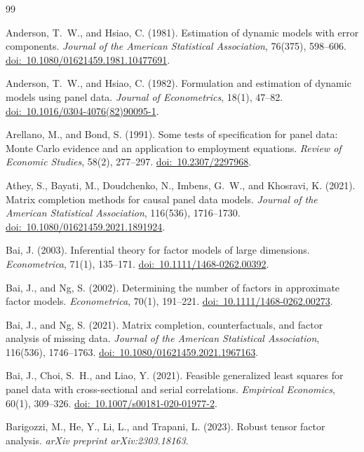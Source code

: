 \documentclass[11pt]{article}
\numberwithin{equation}{section}
\theoremstyle{remark}
\newcommand{\doilink}[1]{\href{https://doi.org/#1}{doi:\ #1}}
\begin{document}
\begin{singlespace}
\begin{thebibliography}{99}

Anderson, T.~W., and Hsiao, C. (1981).
Estimation of dynamic models with error components.
\emph{Journal of the American Statistical Association}, 76(375), 598--606.
\doilink{10.1080/01621459.1981.10477691}.

Anderson, T.~W., and Hsiao, C. (1982).
Formulation and estimation of dynamic models using panel data.
\emph{Journal of Econometrics}, 18(1), 47--82.
\doilink{10.1016/0304-4076(82)90095-1}.

Arellano, M., and Bond, S. (1991).
Some tests of specification for panel data: Monte Carlo evidence and an application to employment equations.
\emph{Review of Economic Studies}, 58(2), 277--297.
\doilink{10.2307/2297968}.

Athey, S., Bayati, M., Doudchenko, N., Imbens, G.~W., and Khosravi, K. (2021).
Matrix completion methods for causal panel data models.
\emph{Journal of the American Statistical Association}, 116(536), 1716--1730.
\doilink{10.1080/01621459.2021.1891924}.

Bai, J. (2003).
Inferential theory for factor models of large dimensions.
\emph{Econometrica}, 71(1), 135--171.
\doilink{10.1111/1468-0262.00392}.

Bai, J., and Ng, S. (2002).
Determining the number of factors in approximate factor models.
\emph{Econometrica}, 70(1), 191--221.
\doilink{10.1111/1468-0262.00273}.

Bai, J., and Ng, S. (2021).
Matrix completion, counterfactuals, and factor analysis of missing data.
\emph{Journal of the American Statistical Association}, 116(536), 1746--1763.
\doilink{10.1080/01621459.2021.1967163}.


Bai, J., Choi, S.~H., and Liao, Y. (2021).
Feasible generalized least squares for panel data with cross-sectional and serial correlations.
\emph{Empirical Economics}, 60(1), 309--326.
\doilink{10.1007/s00181-020-01977-2}.

Barigozzi, M., He, Y., Li, L., and Trapani, L. (2023).
Robust tensor factor analysis.
\emph{arXiv preprint arXiv:2303.18163}.


\end{thebibliography}
\end{singlespace}
\end{document}
